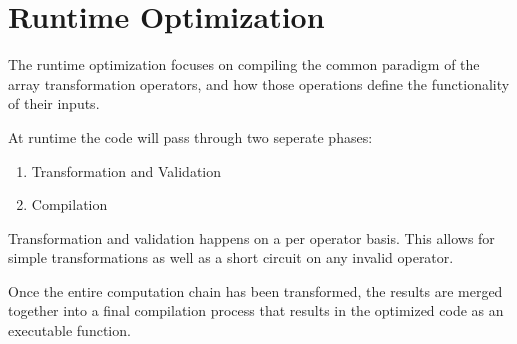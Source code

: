 \section{Runtime Optimization}
The runtime optimization focuses on compiling the common paradigm of the array transformation operators, and how those operations define the functionality of their inputs.

At runtime the code will pass through two seperate phases:

\begin{enumerate}
  \item Transformation and Validation
  \item Compilation
\end{enumerate}

Transformation and validation happens on a per operator basis.  This allows for simple transformations as well as a short circuit on any invalid operator.

Once the entire computation chain has been transformed, the results are merged together into a final compilation process that results in the optimized code as an executable function. 

\begin{minipage}{\linewidth}

\end{minipage}


